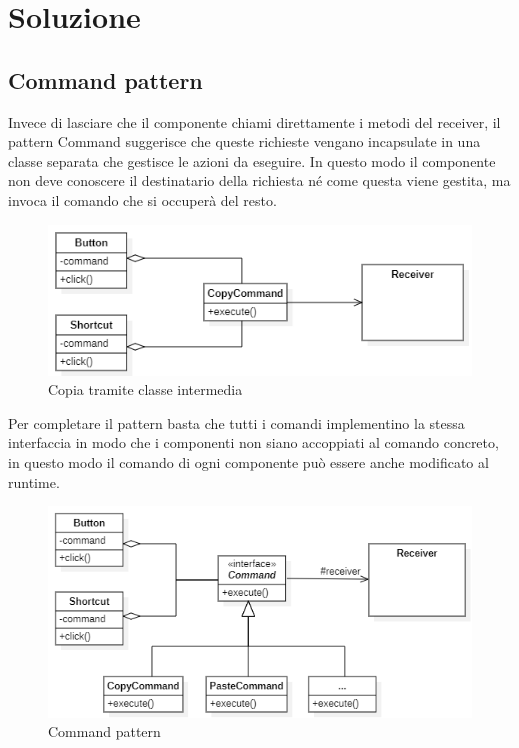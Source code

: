 \documentclass[12pt]{article}
\begin{document}
\section{Soluzione}
\subsection{Command pattern}
Invece di lasciare che il componente chiami direttamente i metodi del receiver, il pattern Command suggerisce che queste richieste vengano incapsulate in una classe separata che gestisce le azioni da eseguire. In questo modo il componente non deve conoscere il destinatario della richiesta né come questa viene gestita, ma invoca il comando che si occuperà del resto.
\begin{figure}[h!]
\centering
\includegraphics[scale=0.8]{commandBetter.png}
\caption{Copia tramite classe intermedia}
\label{fig:proCopy}
\end{figure}
\newpage
Per completare il pattern basta che tutti i comandi implementino la stessa interfaccia in modo che i componenti non siano accoppiati al comando concreto, in questo modo il comando di ogni componente può essere anche modificato al runtime.
\begin{figure}[h!]
\centering
\includegraphics[scale=0.7]{commandPattern.png}
\caption{Command pattern}
\label{fig:commandPattern}
\end{figure}
\end{document}

